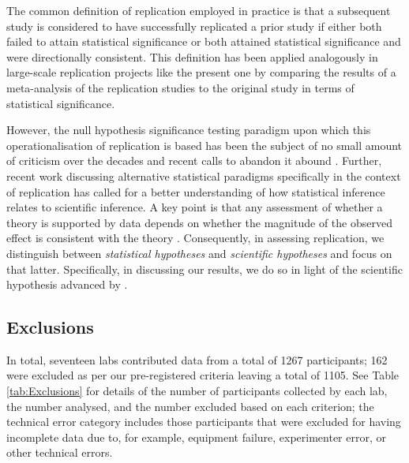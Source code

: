 \documentclass[A4paper,man,floatsintext]{apa6}
\theoremstyle{definition}
\theoremstyle{definition}
\theoremstyle{definition}
\theoremstyle{remark}
\begin{document}
The common definition of replication employed in practice is that a
subsequent study is considered to have successfully replicated a prior
study if either both failed to attain statistical significance or both
attained statistical significance and were directionally consistent.
This definition has been applied analogously in large-scale replication
projects like the present one by comparing the results of a
meta-analysis of the replication studies to the original study in terms
of statistical significance.

However, the null hypothesis significance testing paradigm upon which
this operationalisation of replication is based has been the subject of
no small amount of criticism over the decades \autocites[see, for
example,][]{Rozenboom}{Meehl1978}{Cohen1994}{Gelman2003}{McShane2016}{McShane2017}
and recent calls to abandon it abound
\autocites{Amrhein}{mcshane2019}{Wasserstein}{AmrheinGreendlandMcShane}.
Further, recent work discussing alternative statistical paradigms
specifically in the context of replication \autocite{CollingSzucs} has
called for a better understanding of how statistical inference relates
to scientific inference. A key point is that any assessment of whether a
theory is supported by data depends on whether the magnitude of the
observed effect is consistent with the theory \autocite{Gelman:effect}.
Consequently, in assessing replication, we distinguish between
\emph{statistical hypotheses} and \emph{scientific hypotheses} and focus
on that latter. Specifically, in discussing our results, we do so in
light of the scientific hypothesis advanced by
\textcite{Fischer:2003ju}.

\subsection{Exclusions}\label{exclusions}

In total, seventeen labs contributed data from a total of 1267
participants; 162 were excluded as per our pre-registered criteria
leaving a total of 1105. See Table \ref{tab:Exclusions} for details of
the number of participants collected by each lab, the number analysed,
and the number excluded based on each criterion; the technical error
category includes those participants that were excluded for having
incomplete data due to, for example, equipment failure, experimenter
error, or other technical errors.
\end{document}
